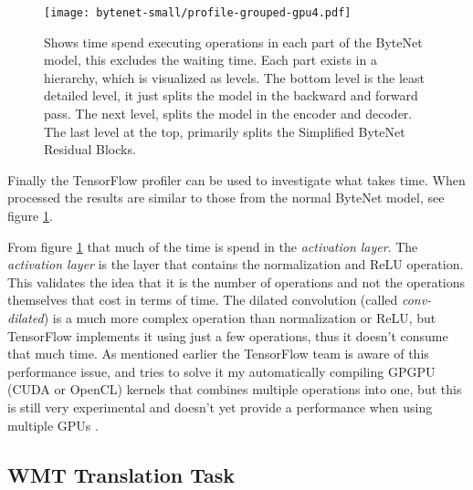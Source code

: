 \begin{figure}[h]
    \centering
    \texttt{[image: bytenet-small/profile-grouped-gpu4.pdf]}
    \caption{Shows time spend executing operations in each part of the ByteNet model, this excludes the waiting time. Each part exists in a hierarchy, which is visualized as levels. The bottom level is the least detailed level, it just splits the model in the backward and forward pass. The next level, splits the model in the encoder and decoder. The last level at the top, primarily splits the Simplified ByteNet Residual Blocks.}
    \label{fig:result:simple-bytenet:profile-grouped}
\end{figure}

Finally the TensorFlow profiler can be used to investigate what takes time. When processed the results are similar to those from the normal ByteNet model, see figure \ref{fig:result:simple-bytenet:profile-grouped}.

From figure \ref{fig:result:simple-bytenet:profile-grouped} that much of the time is spend in the \textit{activation layer}. The \textit{activation layer} is the layer that contains the normalization and ReLU operation. This validates the idea that it is the number of operations and not the operations themselves that cost in terms of time. The dilated convolution (called \textit{conv-dilated}) is a much more complex operation than normalization or ReLU, but TensorFlow implements it using just a few operations, thus it doesn't consume that much time. As mentioned earlier the TensorFlow team is aware of this performance issue, and tries to solve it my automatically compiling GPGPU (CUDA or OpenCL) kernels that combines multiple operations into one, but this is still very experimental and doesn't yet provide a performance when using multiple GPUs \cite{citation-needed}.

\clearpage
\subsection{WMT Translation Task}

